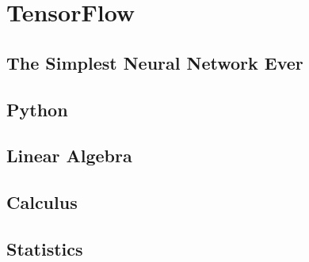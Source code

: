 \documentclass[
]{book}
\theoremstyle{definition}
\theoremstyle{definition}
\theoremstyle{definition}
\theoremstyle{remark}
\begin{document}
\hypertarget{part-tensorflow}{%
\part{TensorFlow}\label{part-tensorflow}}

\hypertarget{the-simplest-neural-network-ever}{%
\chapter{The Simplest Neural Network Ever}\label{the-simplest-neural-network-ever}}

\hypertarget{appendix-appendix}{%
\appendix}


\hypertarget{python}{%
\chapter{Python}\label{python}}

\hypertarget{linear-algebra}{%
\chapter{Linear Algebra}\label{linear-algebra}}

\hypertarget{calculus}{%
\chapter{Calculus}\label{calculus}}

\hypertarget{statistics}{%
\chapter{Statistics}\label{statistics}}
\end{document}
